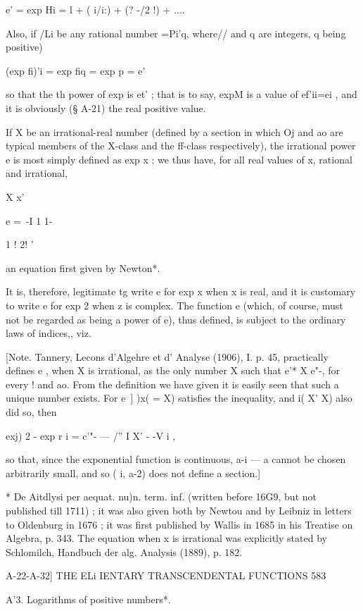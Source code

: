 e'  = exp Hi = l + ( i/i:) + (? -/2 !) + .... 

Also, if /Li be any rational number  =Pi'q, where// and q are integers, q being positive) 

(exp fi)'i = exp fiq = exp p = e'\ 

so that the   th power of exp  is et' ; that is to say, expM is a value of ef'ii=ei , and it is 
obviously (§ A-21) the real positive value. 

If X be an irrational-real number (defined by a section in which Oj and ao are typical 
members of the X-class and the  ff-class respectively), the irrational power e  is most 
simply defined as exp x ; we thus have, for all real values of x, rational and irrational, 

X x'  

e =\ -I 1 1- 

1 ! 2! ' 

an equation first given by Newton*. 

It is, therefore, legitimate tg write e  for exp x when x is real, and it is customary to 
write e  for exp 2 when z is complex. The function e  (which, of course, must not be 
regarded as being a power of e), thus defined, is subject to the ordinary laws of indices,, viz. 

[Note. Tannery, Lecons d'Algehre et d' Analyse (1906), I. p. 45, practically defines e , 
when X is irrational, as the only number X such that e'* X e"-, for every  ! and ao. 
From the definition we have given it is easily seen that such a unique number exists. 
For e\ ] )x( = X) satisfies the inequality, and i( X'   X) also did so, then 

exj)  2 - exp r i = c'"- — /''   I X' - -V i , 

so that, since the exponential function is continuous, a-i — a  cannot be chosen arbitrarily 
small, and so ( i, a-2) does not define a section.] 

* De Aitdlysi per aequat. nu)n. term. inf. (written before 16G9, but not published till 1711) ; 
it was also given both by Newtou and by Leibniz in letters to Oldenburg in 1676 ; it was first 
published by Wallis in 1685 in his Treatise on Algebra, p. 343. The equation when x is irrational 
was explicitly stated by Schlomilch, Handbuch der alg. Analysis (1889), p. 182. 



A-22-A-32] THE ELi IENTARY TRANSCENDENTAL FUNCTIONS 583 

A'3. Logarithms of positive numbers*. 

